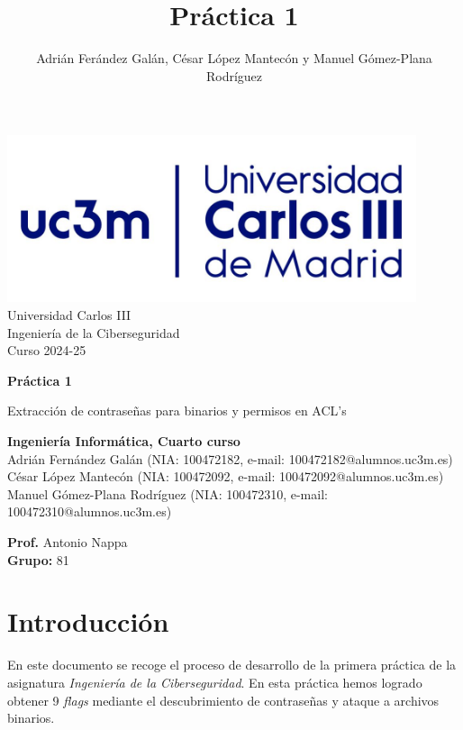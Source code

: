 \documentclass[]{article}
\title{Práctica 1}
\author{Adrián Ferández Galán, César López Mantecón y Manuel Gómez-Plana Rodríguez}
\begin{document}
\begin{titlepage}
    \centering
   \includegraphics[width=0.9\textwidth]{uc3m.jpg} 
    {\Huge Universidad Carlos III\\
    
     \Large Ingeniería de la Ciberseguridad\\
     \vspace{0.5cm}
     Curso 2024-25}
    \vspace{2cm}

    {\Huge \textbf{Práctica 1} \par}
    \vspace{0.5cm}
    {\Large Extracción de contraseñas para binarios y permisos en ACL's\par}
    \vspace{8cm}

   \textbf{Ingeniería Informática, Cuarto curso}\\
    \vspace{0.2cm} 
    Adrián Fernández Galán       (NIA: 100472182, e-mail: 100472182@alumnos.uc3m.es)\\
    César López Mantecón         (NIA: 100472092, e-mail: 100472092@alumnos.uc3m.es)\\
    Manuel Gómez-Plana Rodríguez (NIA: 100472310, e-mail: 100472310@alumnos.uc3m.es)
    \vspace{0.5cm}

   
    \textbf{Prof.} Antonio Nappa\\
    
    \textbf{Grupo: } 81   
    
\end{titlepage}
\newpage


\newpage

\section{Introducción}
\label{sec:introduccion}
En este documento se recoge el proceso de desarrollo de la primera práctica de la asignatura \textit{Ingeniería de la Ciberseguridad}. En esta práctica hemos logrado obtener 9 \textit{flags} mediante el descubrimiento de contraseñas y ataque a archivos binarios. 
\end{document}
